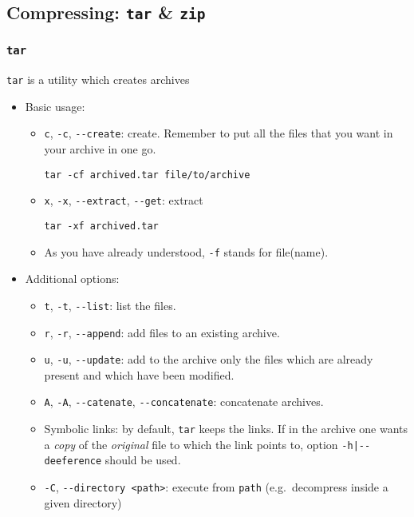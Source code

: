 \documentclass[a4paper,12pt,%
              final%
              ]{article}
\begin{document}
\subsection{Compressing: \texttt{tar} \& \texttt{zip}}
\subsubsection{\texttt{tar}}
\texttt{tar} is a utility which creates archives
\begin{itemize}
  \item Basic usage:
    \begin{itemize}
      \item \verb|c|, \verb|-c|, \verb|--create|: create. Remember to put all the files that you want in your archive in one go.
\begin{verbatim}
tar -cf archived.tar file/to/archive
\end{verbatim}
      \item \verb|x|, \verb|-x|, \verb|--extract|, \verb|--get|: extract
\begin{verbatim}
tar -xf archived.tar
\end{verbatim}
      \item As you have already understood, \verb|-f| stands for file(name).
    \end{itemize}
  \item Additional options:
    \begin{itemize}
      \item \verb|t|, \verb|-t|, \verb|--list|: list the files.
      \item \verb|r|, \verb|-r|, \verb|--append|: add files to an existing archive.
      \item \verb|u|, \verb|-u|, \verb|--update|: add to the archive only the files which are already present and which have been modified.
      \item \verb|A|, \verb|-A|, \verb|--catenate|, \verb|--concatenate|: concatenate archives.
      \item Symbolic links: by default, \texttt{tar} keeps the links. If in the archive one wants a \emph{copy} of the \emph{original} file to which the link points to, option \verb!-h|--deeference! should be used.
      \item \verb|-C|, \verb|--directory <path>|: execute from \verb|path| (e.g.~decompress inside a given directory)

\end{itemize}
\end{itemize}
\end{document}
